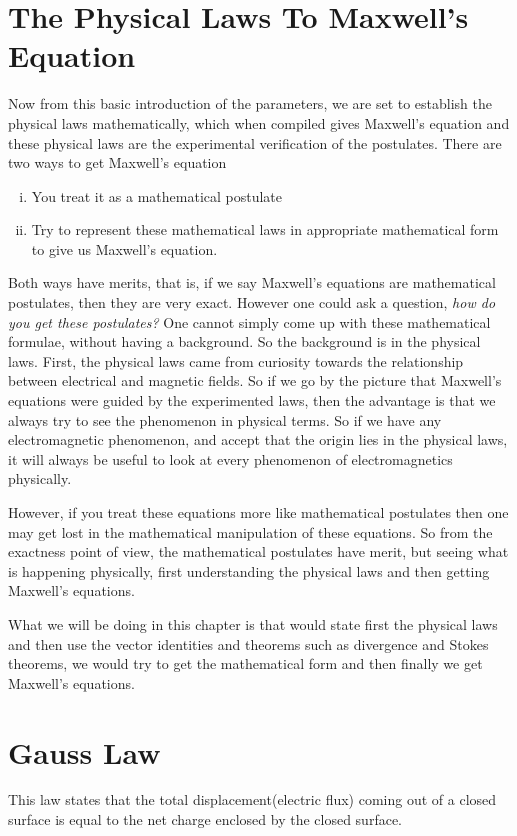 \section{The Physical Laws To Maxwell's Equation}
Now from this basic introduction of the parameters, we are set to establish the physical laws mathematically, which when compiled gives Maxwell's equation and these physical laws are the experimental verification of the postulates. There are two ways to get Maxwell's equation
\begin{enumerate}[(i)]
\item You treat it as a mathematical postulate
\item Try to represent these mathematical laws in appropriate mathematical form to give us Maxwell's equation.
\end{enumerate}

Both ways have merits, that is, if we say Maxwell's equations are mathematical postulates, then they are very exact. However one could ask a question, \emph{how do you get these postulates?} One cannot simply come up with these mathematical formulae, without having a background. So the background is in the physical laws. First, the physical laws came from curiosity towards the relationship between electrical and magnetic fields. So if we go by the picture that Maxwell's equations were guided by the experimented laws, then the advantage is that we always try to see the phenomenon in physical terms. So if we have any electromagnetic phenomenon, and accept that the origin lies in the physical laws, it will always be useful to look at every phenomenon of electromagnetics physically.

However, if you treat these equations more like mathematical postulates then one may get lost in the mathematical manipulation of these equations. So from the exactness point of view, the mathematical postulates have merit, but seeing what is happening physically, first understanding the physical laws and then getting Maxwell's equations.

What we will be doing in this chapter is that would state first the physical laws and then use the vector identities and theorems such as divergence and Stokes theorems, we would try to get the mathematical form and then finally we get Maxwell's equations.

\section{Gauss Law}
This law states that the total displacement(electric flux) coming out of a closed surface is equal to the net charge enclosed by the closed surface.

